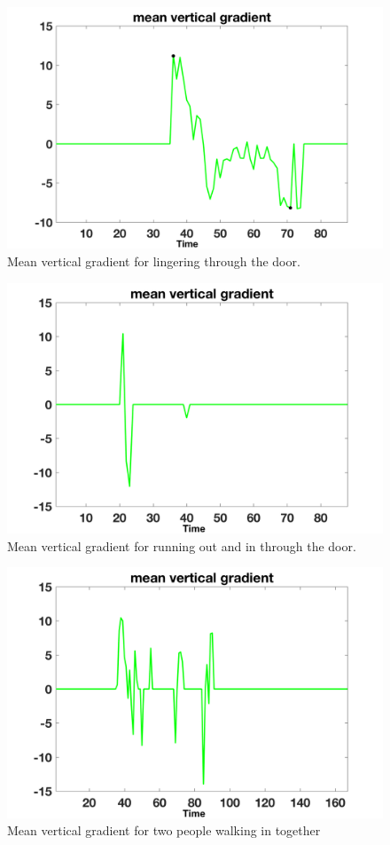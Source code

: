 \documentclass[12pt,oneside]{article} %
\begin{document}
\begin{figure}[htb]
\centering
\includegraphics[scale=0.52]{images/lingerThrough.png}
\caption{Mean vertical gradient for lingering through the door.}
\label{linger}
\end{figure}

\begin{figure}[htb]
\centering
\includegraphics[scale=0.52]{images/runoutandin.png}
\caption{Mean vertical gradient for running out and in through the door.}
\label{run}
\end{figure}

\begin{figure}[htb]
\centering
\includegraphics[scale=0.52]{images/quickoutandin.png}
\caption{Mean vertical gradient for two people walking in together}
\label{together}
\end{figure}
\end{document}
